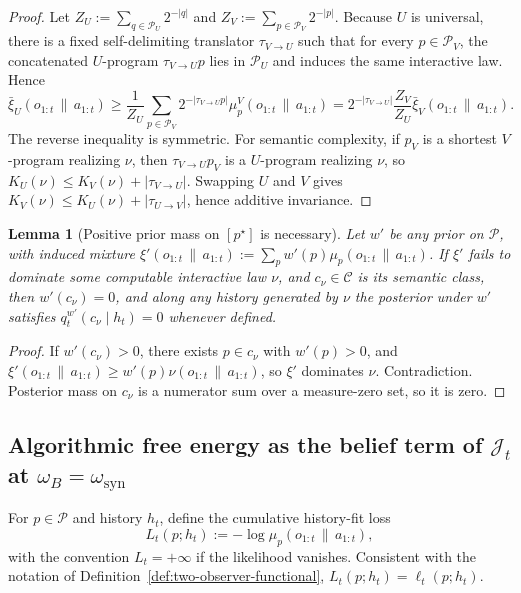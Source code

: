 \documentclass[11pt]{article}
\newtheorem{lemma}[theorem]{Lemma}
\theoremstyle{definition}
\theoremstyle{remark}
\newcommand{\Ccal}{\mathcal{C}}
\newcommand{\Pcal}{\mathcal{P}}
\newcommand{\givena}{\,\|\,}
\newcommand{\ellp}{\ell}
\newcommand{\barxi}{\bar{\xi}}
\begin{document}
\begin{proof}
Let $Z_U:=\sum_{q\in\Pcal_U}2^{-|q|}$ and $Z_V:=\sum_{p\in\Pcal_V}2^{-|p|}$. Because $U$ is universal, there is a fixed self-delimiting translator $\tau_{V\to U}$ such that for every $p\in\Pcal_V$, the concatenated $U$-program $\tau_{V\to U}p$ lies in $\Pcal_U$ and induces the same interactive law. Hence
\[
\barxi_U(o_{1:t}\givena a_{1:t})
\ge
\frac{1}{Z_U}\sum_{p\in\Pcal_V}2^{-|\tau_{V\to U}p|}\mu_p^V(o_{1:t}\givena a_{1:t})
=
2^{-|\tau_{V\to U}|}\frac{Z_V}{Z_U}\barxi_V(o_{1:t}\givena a_{1:t}).
\]
The reverse inequality is symmetric. For semantic complexity, if $p_V$ is a shortest $V$-program realizing $\nu$, then $\tau_{V\to U}p_V$ is a $U$-program realizing $\nu$, so $K_U(\nu)\le K_V(\nu)+|\tau_{V\to U}|$. Swapping $U$ and $V$ gives $K_V(\nu)\le K_U(\nu)+|\tau_{U\to V}|$, hence additive invariance.
\end{proof}

\begin{lemma}[{Positive prior mass on $[p^\star]$ is necessary}]
\label{lem:prior-necessity}
Let $w'$ be any prior on $\Pcal$, with induced mixture $\xi'(o_{1:t}\givena a_{1:t}):=\sum_p w'(p)\mu_p(o_{1:t}\givena a_{1:t})$. If $\xi'$ fails to dominate some computable interactive law $\nu$, and $c_\nu\in\Ccal$ is its semantic class, then $w'(c_\nu)=0$, and along any history generated by $\nu$ the posterior under $w'$ satisfies $q_t^{w'}(c_\nu\mid h_t)=0$ whenever defined.
\end{lemma}

\begin{proof}
If $w'(c_\nu)>0$, there exists $p\in c_\nu$ with $w'(p)>0$, and $\xi'(o_{1:t}\givena a_{1:t})\ge w'(p)\nu(o_{1:t}\givena a_{1:t})$, so $\xi'$ dominates $\nu$. Contradiction. Posterior mass on $c_\nu$ is a numerator sum over a measure-zero set, so it is zero.
\end{proof}

\subsection{Algorithmic free energy as the belief term of $\mathcal J_t$ at $\omega_B=\omega_{\mathrm{syn}}$}

For $p\in\Pcal$ and history $h_t$, define the cumulative history-fit loss
\[
L_t(p;h_t):=-\log\mu_p(o_{1:t}\givena a_{1:t}),
\]
with the convention $L_t=+\infty$ if the likelihood vanishes. Consistent with the notation of Definition~\ref{def:two-observer-functional}, $L_t(p;h_t)=\ellp_t(p;h_t)$.
\end{document}
